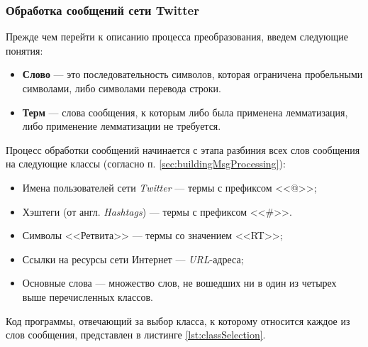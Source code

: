     \lstset{style=python}
    

    \subsubsection{Обработка сообщений сети Twitter}
    Прежде чем перейти к описанию процесса преобразования, введем следующие
    понятия:
    \begin{itemize}
        \item {\bf Слово} --- это последовательность символов, которая ограничена
            пробельными символами, либо символами перевода строки.
        \item {\bf Терм} --- слова сообщения, к которым либо была применена
            лемматизация, либо применение лемматизации не требуется.
    \end{itemize}


    Процесс обработки сообщений начинается с этапа разбиния всех слов сообщения
    на следующие классы (согласно п. \ref{sec:buildingMsgProcessing}):
    \begin{itemize}
        \item Имена пользователей сети {\it Twitter} --- термы с префиксом <<@>>;
        \item Хэштеги (от англ. {\it Hashtags}) --- термы с префиксом <<\#>>.
        \item Символы <<Ретвита>> --- термы со значением <<RT>>;
        \item Ссылки на ресурсы сети Интернет --- {\it URL\hspace{1pt}}-адреса;
        \item Основные слова --- множество слов, не вошедших ни в один из четырех
            выше перечисленных классов.
    \end{itemize}

    Код программы, отвечающий за выбор класса, к которому относится каждое из
    слов сообщения, представлен в листинге \ref{lst:classSelection}.

